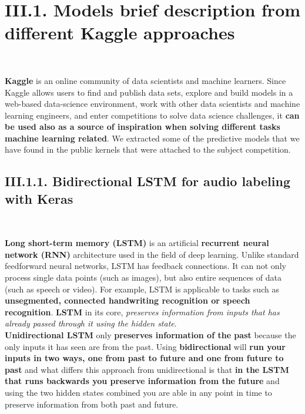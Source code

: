 \documentclass[11pt, a4papper]{report}
\theoremstyle{plain}
\theoremstyle{definition}
\theoremstyle{definition}
\theoremstyle{proposition}
\begin{document}
\section*{III.1. Models brief description from different Kaggle approaches}
\

\textbf{Kaggle} \cite{9} is an online community of data scientists and machine learners. Since Kaggle allows users to find and publish data sets, explore and build models in a web-based data-science environment, work with other data scientists and machine learning engineers, and enter competitions to solve data science challenges, it \textbf{can be used also as a source of inspiration when solving different tasks machine learning related}. We extracted some of the predictive models that we have found in the public kernels that were attached to the subject competition.

\subsection*{III.1.1. Bidirectional LSTM for audio labeling with Keras}
\

\textbf{Long short-term memory (LSTM)} is an artificial \textbf{recurrent neural network (RNN)} architecture used in the field of deep learning. Unlike standard feedforward neural networks, LSTM has feedback connections. It can not only process single data points (such as images), but also entire sequences of data (such as speech or video). For example, LSTM is applicable to tasks such as \textbf{unsegmented, connected handwriting recognition or speech recognition}. \textbf{LSTM} in its core, \textit{preserves information from inputs that has already passed through it using the hidden state}.
\\

\textbf{Unidirectional LSTM} only \textbf{preserves information of the past} because the only inputs it has seen are from the past. Using \textbf{bidirectional} will \textbf{run your inputs in two ways, one from past to future and one from future to past} and what differs this approach from unidirectional is that \textbf{in the LSTM that runs backwards you preserve information from the future} and using the two hidden states combined you are able in any point in time to preserve information from both past and future.
\\
\end{document}
